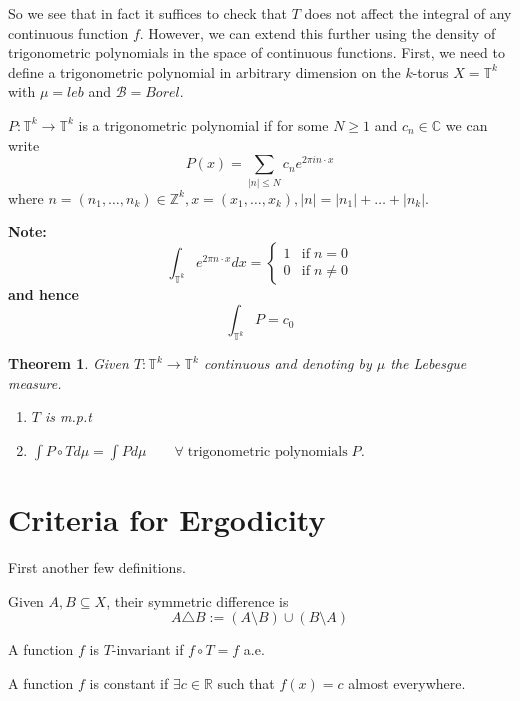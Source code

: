 \documentclass[11pt]{article}
\newcommand{\defeq}{:=}
\newcommand{\abs}[1]{\left|#1\right|}
\newcommand{\symd}{\triangle}
\newcommand{\ktor}{\mathbb{T}^k}
\newcommand{\R}{\mathbb{R}}
\newcommand{\C}{\mathbb{C}}
\newcommand{\Z}{\mathbb{Z}}
\newenvironment{defin}
	{\begin{mdframed}[backgroundcolor=white, roundcorner=5pt, linewidth=1pt]}
	{\end{mdframed}}
\newcommand{\mdf}[1]{{\color{red} #1}}
\newenvironment{note}
	{\begin{mdframed}[backgroundcolor=white, linecolor=red, roundcorner=5pt, linewidth=1pt]\bfseries{Note:}\normalfont}
	{\end{mdframed}}
\newtheorem{theorem}[prop]{Theorem}
\begin{document}
So we see that in fact it suffices to check that $T$ does not affect the integral of any continuous function $f$.
However, we can extend this further using the density of trigonometric polynomials in the space of continuous functions. 
First, we need to define a trigonometric polynomial in arbitrary dimension on the $k$-torus $X=\ktor$ with $\mu=leb$ and $\mathcal{B}=Borel$.
\begin{defin}
	$P:\ktor\to\ktor$ is a \mdf{trigonometric polynomial} if for some $N\geq 1$ and $c_n\in\C$ we can write
	$$P(x)=\sum_{\abs{n}\leq N} c_n e^{2\pi in\cdot x}$$
	where $n=(n_1,\dots,n_k)\in\Z^k, x=(x_1,\dots,x_k), \abs{n}=\abs{n_1}+\dots+\abs{n_k}$.
\end{defin}
\begin{note}
	\[
		\int_{\ktor} e^{2\pi n\cdot x} dx =
		\begin{cases}
			1 & \text{if} \; n=0\\
			0 & \text{if} \; n\neq 0
		\end{cases}
	\]
	and hence
	$$\int_{\ktor}P = c_0$$
\end{note}

\begin{theorem}
Given $T:\ktor\to \ktor$ continuous and denoting by $\mu$ the Lebesgue measure.
\begin{enumerate}
	\item $T$ is m.p.t
	\item $\int P\circ T d\mu = \int P d\mu \quad\quad \forall\; \text{trigonometric polynomials}\; P$. 
\end{enumerate}
\end{theorem}

\section{Criteria for Ergodicity}
First another few definitions.
\begin{defin}
Given $A,B\subseteq X$, their \mdf{symmetric difference} is
$$A\symd B\defeq (A \setminus B)\cup (B \setminus A)$$

A function $f$ is \mdf{$T$-invariant} if $f \circ T = f$ a.e.

A function $f$ is \mdf{constant} if $\exists c\in\R$ such that $f(x) = c$ almost everywhere.
\end{defin}
\end{document}
